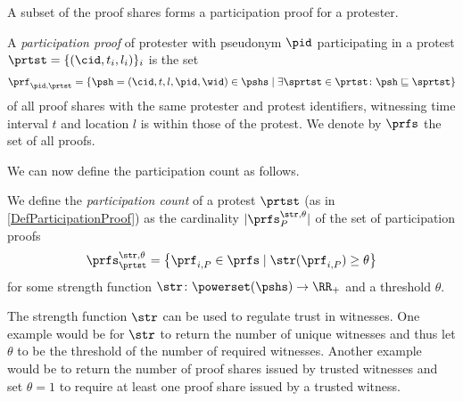 A subset of the proof shares forms a participation proof for a protester.

\NewVariable{\prf}{\pi}
\NewVariable{\prfs}{\Pi}

\begin{definition}%
  \label{DefParticipationProof}\label{DefParticipationProofs}
  A \emph{participation proof} of protester with pseudonym \(\pid\) 
  participating in a protest \(\prtst = \{ (\cid, t_i, l_i) \}_i\) is the set
  \begin{multline}
    \nonumber
    \prf_{\pid, \prtst} =
    \left\{ \psh = (\cid, t, l, \pid, \wid)\in \pshs \mid
      \exists \sprtst\in \prtst\colon \psh\sqsubseteq \sprtst \right\}
  \end{multline}
  of all proof shares with the same protester and protest identifiers, 
  witnessing time interval \(t\) and location \(l\) is within those of the 
  protest.
  We denote by \(\prfs\) the set of all proofs.
\end{definition}

\NewFunction{\str}{\varsigma}

We can now define the participation count as follows.
\begin{definition}%
  \label{DefParticipationCount}
  We define the \emph{participation count} of a protest \(\prtst\) (as in 
  \cref{DefParticipationProof}) as the cardinality \(|\prfs_{P}^{\str,\theta}|\) 
  of the set of participation proofs \[
    \prfs_{\prtst}^{\str,\theta} = \left\{ \prf_{i,P} \in \prfs \mid
      \str(\prf_{i,P})\geq \theta \right\}
  \] for some strength function \(\str\colon \powerset(\pshs)\to \RR_+\) and a 
  threshold \(\theta\).
\end{definition}
The strength function \(\str\) can be used to regulate trust in witnesses.
One example would be for \(\str\) to return the number of unique witnesses and 
thus let \(\theta\) to be the threshold of the number of required witnesses.
Another example would be to return the number of proof shares issued by trusted 
witnesses and set \(\theta = 1\) to require at least one proof share issued by a 
trusted witness.

